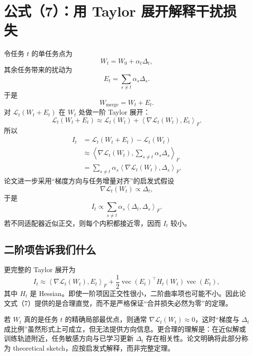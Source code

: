 \documentclass[UTF8,12pt,a4paper,fontset=none]{ctexart}
\numberwithin{equation}{section}
\newcommand{\ip}[2]{\left\langle #1,#2\right\rangle_F}
\newcommand{\Loss}{\mathcal{L}}
\begin{document}
\section{公式（7）：用 Taylor 展开解释干扰损失}

令任务 $t$ 的单任务点为
\begin{equation}
  W_t=W_0+\alpha_t\Delta_t,
\end{equation}
其余任务带来的扰动为
\begin{equation}
  E_t=\sum_{s\neq t}\alpha_s\Delta_s.
\end{equation}
于是
\begin{equation}
  W_{\mathrm{merge}}=W_t+E_t.
\end{equation}
对 $\Loss_t(W_t+E_t)$ 在 $W_t$ 处做一阶 Taylor 展开：
\begin{equation}
  \Loss_t(W_t+E_t)
  \approx \Loss_t(W_t)
  +\ip{\nabla\Loss_t(W_t)}{E_t}.
\end{equation}
所以
\begin{align}
  I_t
  &=\Loss_t(W_t+E_t)-\Loss_t(W_t)\\
  &\approx
  \ip{\nabla\Loss_t(W_t)}{
  \sum_{s\neq t}\alpha_s\Delta_s}\\
  &=\sum_{s\neq t}\alpha_s
  \ip{\nabla\Loss_t(W_t)}{\Delta_s}.
  \label{eq:taylor1}
\end{align}
论文进一步采用“梯度方向与任务增量对齐”的启发式假设
\begin{equation}
  \nabla\Loss_t(W_t)\propto\Delta_t,
\end{equation}
于是
\begin{equation}
  I_t
  \propto
  \sum_{s\neq t}\alpha_s
  \ip{\Delta_t}{\Delta_s}.
  \tag{7}
  \label{eq:paper7}
\end{equation}
若不同适配器近似正交，则每个内积都接近零，因而 $I_t$ 较小。

\subsection{二阶项告诉我们什么}

更完整的 Taylor 展开为
\begin{equation}
  I_t
  \approx
  \ip{\nabla\Loss_t(W_t)}{E_t}
  +\frac12\operatorname{vec}(E_t)^{\top}
  H_t(W_t)
  \operatorname{vec}(E_t),
  \label{eq:taylor2}
\end{equation}
其中 $H_t$ 是 Hessian。即使一阶项因正交性很小，二阶曲率项也可能不小。因此论文式（7）提供的是合理直觉，而不是严格保证“合并损失必然为零”的定理。

\begin{criticalbox}[梯度对齐假设的张力]
若 $W_t$ 真的是任务 $t$ 的精确局部最优点，则通常 $\nabla\Loss_t(W_t)\approx0$，这时“梯度与 $\Delta_t$ 成比例”虽然形式上可成立，但无法提供方向信息。更合理的理解是：在近似解或训练轨迹附近，任务敏感方向与已学习更新 $\Delta_t$ 存在相关性。论文明确将此部分称为 theoretical sketch，应按启发式解释，而非完整定理。
\end{criticalbox}
\end{document}
